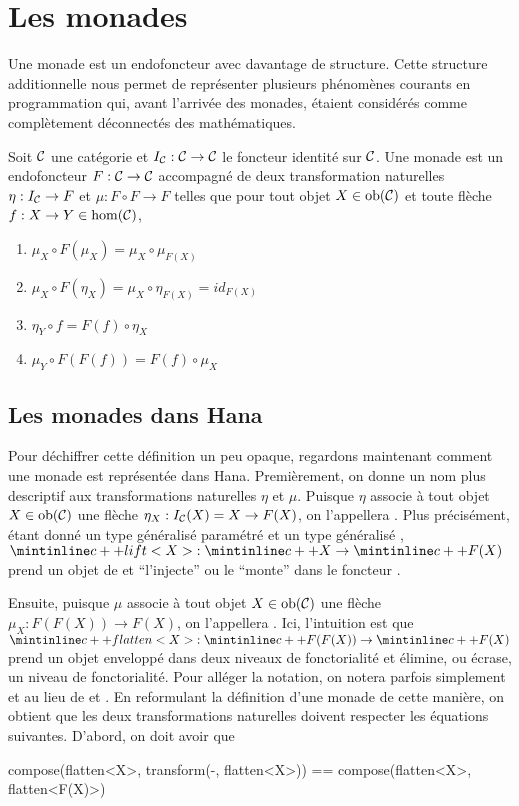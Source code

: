 \section{Les monades}
Une monade est un endofoncteur avec davantage de structure. Cette structure
additionnelle nous permet de représenter plusieurs phénomènes courants en
programmation qui, avant l'arrivée des monades, étaient considérés comme
complètement déconnectés des mathématiques.

\begin{définition}[Monade]
    Soit $\mathcal{C}$ une catégorie et $I_{\mathcal{C}} : \mathcal{C} \to \mathcal{C}$ le foncteur identité sur
    $\mathcal{C}$. Une monade est un endofoncteur $F : \mathcal{C} \to \mathcal{C}$ accompagné de deux
    transformation naturelles $\eta : I_{\mathcal{C}} \to F$ et $\mu : F \circ F \to F$
    telles que pour tout objet $X \in \mathrm{ob}(\mathcal{C})$ et toute flèche
    $f : X \to Y \in \hom(\mathcal{C})$,
    \begin{enumerate}
        \item $\mu_X \circ F(\mu_X) = \mu_X \circ \mu_{F(X)}$
        \item $\mu_X \circ F(\eta_X) = \mu_X \circ \eta_{F(X)} = id_{F(X)}$
        \item $\eta_Y \circ f = F(f) \circ \eta_X$
        \item $\mu_Y \circ F(F(f)) = F(f) \circ \mu_X$
    \end{enumerate}
\end{définition}


\subsection{Les monades dans Hana}
Pour déchiffrer cette définition un peu opaque, regardons maintenant comment
une monade est représentée dans Hana. Premièrement, on donne un nom plus
descriptif aux transformations naturelles $\eta$ et $\mu$. Puisque $\eta$
associe à tout objet $X \in \mathrm{ob}(\mathcal{C})$ une flèche $\eta_X : I_{\mathcal{C}}(X) = X \to F(X)$,
on l'appellera . Plus précisément, étant donné un type généralisé
paramétré  et un type généralisé , $\cc{lift<X>} : \cc{X} \to \cc{F(X)}$
prend un objet de  et ``l'injecte'' ou le ``monte'' dans le foncteur .

Ensuite, puisque $\mu$ associe à tout objet $X \in \mathrm{ob}(\mathcal{C})$ une flèche
$\mu_X : F(F(X)) \to F(X)$, on l'appellera . Ici, l'intuition
est que $\cc{flatten<X>} : \cc{F(F(X))} \to \cc{F(X)}$ prend un objet
enveloppé dans deux niveaux de fonctorialité et élimine, ou écrase, un niveau
de fonctorialité. Pour alléger la notation, on notera parfois simplement
 et  au lieu de  et .
En reformulant la définition d'une monade de cette manière, on obtient que
les deux transformations naturelles doivent respecter les équations suivantes.
D'abord, on doit avoir que
\begin{cpp}
    compose(flatten<X>, transform(-, flatten<X>))
        == compose(flatten<X>, flatten<F(X)>)
\end{cpp}

